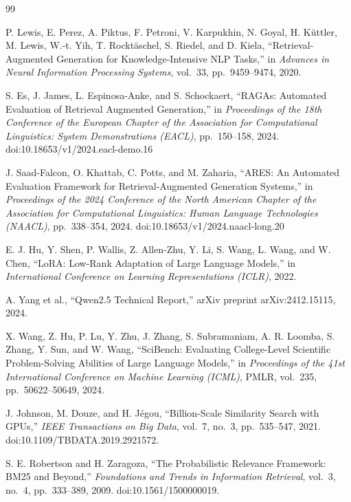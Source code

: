 \documentclass[a4paper,fleqn]{cas-sc}
\begin{document}
\begin{thebibliography}{99}

P. Lewis, E. Perez, A. Piktus, F. Petroni, V. Karpukhin, N. Goyal, H. K\"{u}ttler, M. Lewis, W.-t. Yih, T. Rockt\"{a}schel, S. Riedel, and D. Kiela,
``Retrieval-Augmented Generation for Knowledge-Intensive NLP Tasks,''
in \textit{Advances in Neural Information Processing Systems}, vol.~33, pp.~9459--9474, 2020.

S. Es, J. James, L. Espinosa-Anke, and S. Schockaert,
``RAGAs: Automated Evaluation of Retrieval Augmented Generation,''
in \textit{Proceedings of the 18th Conference of the European Chapter of the Association for Computational Linguistics: System Demonstrations (EACL)}, pp.~150--158, 2024.
doi:10.18653/v1/2024.eacl-demo.16

J. Saad-Falcon, O. Khattab, C. Potts, and M. Zaharia,
``ARES: An Automated Evaluation Framework for Retrieval-Augmented Generation Systems,''
in \textit{Proceedings of the 2024 Conference of the North American Chapter of the Association for Computational Linguistics: Human Language Technologies (NAACL)}, pp.~338--354, 2024.
doi:10.18653/v1/2024.naacl-long.20

E. J. Hu, Y. Shen, P. Wallis, Z. Allen-Zhu, Y. Li, S. Wang, L. Wang, and W. Chen,
``LoRA: Low-Rank Adaptation of Large Language Models,''
in \textit{International Conference on Learning Representations (ICLR)}, 2022.

A. Yang et al.,
``Qwen2.5 Technical Report,''
arXiv preprint arXiv:2412.15115, 2024.

X. Wang, Z. Hu, P. Lu, Y. Zhu, J. Zhang, S. Subramaniam, A. R. Loomba, S. Zhang, Y. Sun, and W. Wang,
``SciBench: Evaluating College-Level Scientific Problem-Solving Abilities of Large Language Models,''
in \textit{Proceedings of the 41st International Conference on Machine Learning (ICML)}, PMLR, vol.~235, pp.~50622--50649, 2024.

J. Johnson, M. Douze, and H. J\'{e}gou,
``Billion-Scale Similarity Search with GPUs,''
\textit{IEEE Transactions on Big Data},
vol.~7, no.~3,
pp.~535--547,
2021.
doi:10.1109/TBDATA.2019.2921572.


S. E. Robertson and H. Zaragoza,
``The Probabilistic Relevance Framework: BM25 and Beyond,''
\textit{Foundations and Trends in Information Retrieval},
vol.~3, no.~4, pp.~333--389, 2009.
doi:10.1561/1500000019.


\end{thebibliography}
\end{document}
